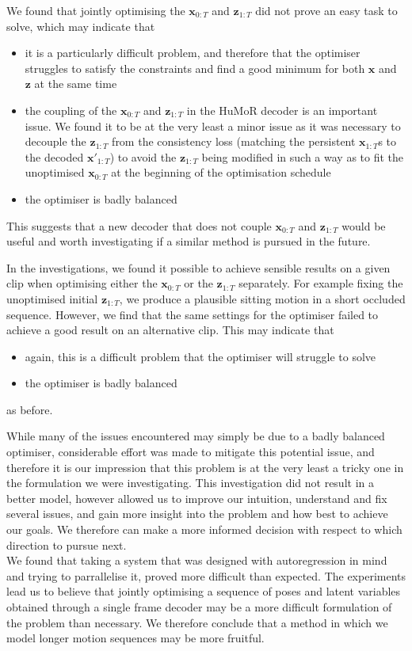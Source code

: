 We found that jointly optimising the $\mathbf{x}_{0:T}$ and $\mathbf{z}_{1:T}$ did not prove an easy task to solve, which may indicate that
\begin{itemize}
    \item it is a particularly difficult problem, and therefore that the optimiser struggles to satisfy the constraints and find a good minimum for both $\mathbf{x}$ and $\mathbf{z}$ at the same time
    \item the coupling of the $\mathbf{x}_{0:T}$ and $\mathbf{z}_{1:T}$ in the HuMoR decoder is an important issue. We found it to be at the very least a minor issue as it was necessary to decouple the $\mathbf{z}_{1:T}$ from the consistency loss (matching the persistent $\mathbf{x}_{1:T}$s to the decoded $\mathbf{x'}_{1:T}$) to avoid the $\mathbf{z}_{1:T}$ being modified in such a way as to fit the unoptimised $\mathbf{x}_{0:T}$ at the beginning of the optimisation schedule
    \item the optimiser is badly balanced
\end{itemize}
This suggests that a new decoder that does not couple $\mathbf{x}_{0:T}$ and $\mathbf{z}_{1:T}$ would be useful and worth investigating if a similar method is pursued in the future.

In the investigations, we found it possible to achieve sensible results on a given clip when optimising either the $\mathbf{x}_{0:T}$ or the $\mathbf{z}_{1:T}$ separately. For example fixing the unoptimised initial $\mathbf{z}_{1:T}$, we produce a plausible sitting motion in a short occluded sequence. However, we find that the same settings for the optimiser failed to achieve a good result on an alternative clip. This may indicate that 
\begin{itemize}
    \item again, this is a difficult problem that the optimiser will struggle to solve
    \item the optimiser is badly balanced
\end{itemize} as before.

While many of the issues encountered may simply be due to a badly balanced optimiser, considerable effort was made to mitigate this potential issue, and therefore it is our impression that this problem is at the very least a tricky one in the formulation we were investigating. This investigation did not result in a better model, however allowed us to improve our intuition, understand and fix several issues, and gain more insight into the problem and how best to achieve our goals. We therefore can make a more informed decision with respect to which direction to pursue next. \\
We found that taking a system that was designed with autoregression in mind and trying to parrallelise it, proved more difficult than expected. The experiments lead us to believe that jointly optimising a sequence of poses and latent variables obtained through a single frame decoder may be a more difficult formulation of the problem than necessary. We therefore conclude that a method in which we model longer motion sequences may be more fruitful.